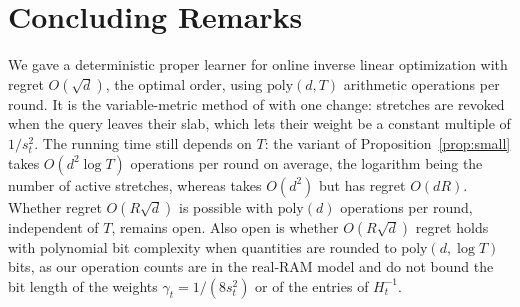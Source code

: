 \documentclass[11pt]{article}
\theoremstyle{plain}
\theoremstyle{definition}
\theoremstyle{remark}
\begin{document}
\section{Concluding Remarks}\label{sec:open}

We gave a deterministic proper learner for online inverse linear optimization with regret
$O(\sqrt d)$, the optimal order, using $\mathrm{poly}(d,T)$ arithmetic operations per round. It is
the variable-metric method of \cite{Cai26} with one change: stretches are revoked when the query
leaves their slab, which lets their weight be a constant multiple of $1/s_t^{2}$. The running time
still depends on $T$: the variant of Proposition~\ref{prop:small} takes $O(d^{2}\log T)$ operations
per round on average, the logarithm being the number of active stretches, whereas \cite{Cai26}
takes $O(d^{2})$ but has regret $O(dR)$. Whether regret $O(R\sqrt d)$ is possible with
$\mathrm{poly}(d)$ operations per round, independent of $T$, remains open. Also open is whether
$O(R\sqrt d)$ regret holds with polynomial bit complexity when quantities are rounded to
$\mathrm{poly}(d,\log T)$ bits, as our operation counts are in the real-RAM model and do not bound
the bit length of the weights $\gamma_t=1/(8s_t^{2})$ or of the entries of $H_t^{-1}$.
\end{document}
